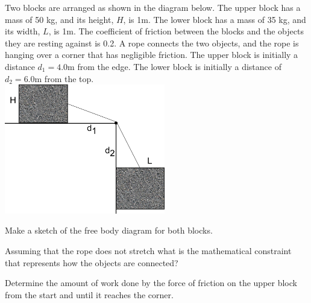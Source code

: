 \begin{problem} 
\item Two blocks are arranged as shown in the diagram below. The upper
  block has a mass of 50 kg, and its height, $H$, is 1m. The lower
  block has a mass of 35 kg, and its width, $L$, is 1m. The
  coefficient of friction between the blocks and the objects they are
  resting against is 0.2. A rope connects the two objects, and the
  rope is hanging over a corner that has negligible friction. The
  upper block is initially a distance $d_1=4.0$m from the edge. The
  lower block is initially a distance of $d_2=6.0$m from
  the top. \\
  \includegraphics[width=7cm]{ink/week10/hangingBlocks}

  \begin{subproblem}
    \item Make a sketch of the free body diagram for both blocks.
      \vfill
    \item Assuming that the rope does not stretch what is the
      mathematical constraint that represents how the objects are
      connected? 
      \vfill
      \clearpage
    \item Determine the amount of work done by the force of friction
      on the upper block from the start and until it reaches the
      corner.
      \vfill
  \end{subproblem}
\end{problem}

\begin{problem}
\item 
  \begin{subproblem}
    \item
  \end{subproblem}
\end{problem}

\postClass

